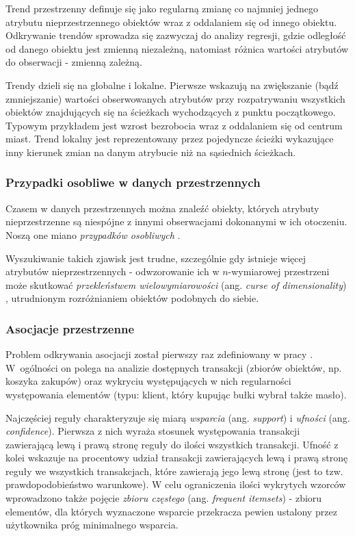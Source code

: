 \documentclass[12pt]{article}
\begin{document}
Trend przestrzenny definuje się \cite{toptrendy} jako regularną zmianę co najmniej jednego atrybutu nieprzestrzennego obiektów wraz z oddalaniem się od innego obiektu. Odkrywanie trendów sprowadza się zazwyczaj do analizy regresji, gdzie odległość od danego obiektu jest zmienną niezależną, natomiast różnica wartości atrybutów do obserwacji - zmienną zależną.

Trendy dzieli się na globalne i lokalne. Pierwsze wskazują na zwiększanie (bądź zmniejszanie) wartości obserwowanych atrybutów przy rozpatrywaniu wszystkich obiektów znajdujących się na ścieżkach wychodzących z punktu początkowego. Typowym przykładem jest wzrost bezrobocia wraz z oddalaniem się od centrum miast. Trend lokalny jest reprezentowany przez pojedyncze ścieżki wykazujące inny kierunek zmian na danym atrybucie niż na sąsiednich ścieżkach.

\subsubsection{Przypadki osobliwe w danych przestrzennych}

Czasem w danych przestrzennych można znaleźć obiekty, których atrybuty nieprzestrzenne są niespójne z innymi obserwacjami dokonanymi w ich otoczeniu. Noszą one miano \textit{przypadków osobliwych} \cite{przypadeg}. 

Wyszukiwanie takich zjawisk jest trudne, szczególnie gdy istnieje więcej atrybutów nieprzestrzennych - odwzorowanie ich w $n$-wymiarowej przestrzeni może skutkować \textit{przekleństwem wielowymiarowości} (ang. \textit{curse of dimensionality}) \cite{belman}, utrudnionym rozróżnianiem obiektów podobnych do siebie.

\subsubsection{Asocjacje przestrzenne}

Problem odkrywania asocjacji został pierwszy raz zdefiniowany w pracy \cite{asoc}. W~ogólności on polega na analizie dostępnych transakcji (zbiorów obiektów, np. koszyka zakupów) oraz wykryciu występujących w nich regularności występowania elementów (typu: klient, który kupując bułki wybrał także masło).

Najczęściej reguły charakteryzuje się miarą \textit{wsparcia} (ang. \textit{support}) i \textit{ufności} (ang. \textit{confidence}). Pierwsza z nich wyraża stosunek występowania transakcji zawierającą lewą i prawą stronę reguły do ilości wszystkich transakcji. Ufność z kolei wskazuje na procentowy udział transakcji zawierających lewą i prawą stronę reguły we wszystkich transakcjach, które zawierają jego lewą stronę (jest to tzw. prawdopodobieństwo warunkowe). W celu ograniczenia ilości wykrytych wzorców wprowadzono także pojęcie \textit{zbioru częstego} (ang. \textit{frequent itemsets}) - zbioru elementów, dla których wyznaczone wsparcie przekracza pewien ustalony przez użytkownika próg minimalnego wsparcia. 
\end{document}
